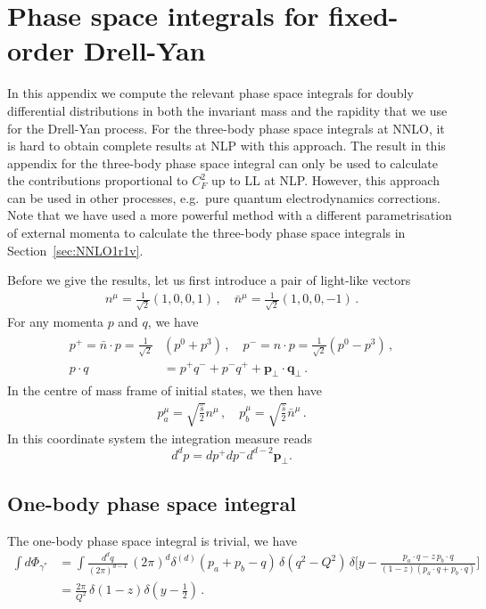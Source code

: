 \documentclass[11pt]{article}
\newcommand{\nn}{\nonumber}
\begin{document}
\section{Phase space integrals for fixed-order Drell-Yan}
\label{PhaseSpace-DY}
In this appendix we compute the relevant phase space integrals for doubly differential distributions in both the invariant mass and the rapidity that we use for the Drell-Yan process. 
For the three-body phase space integrals at NNLO, it is hard to obtain complete results at NLP with this approach. The result in this appendix for the three-body phase space integral can only be used to calculate the contributions proportional to $C_F^2$ up to LL at NLP. However, this approach can be used in other processes, e.g.\ pure quantum electrodynamics corrections. Note that we have used a more powerful method with a different parametrisation of external momenta to calculate the three-body phase space integrals in Section~\ref{sec:NNLO1r1v}. 
 
Before we give the results, let us first introduce 
a pair of light-like vectors
\begin{align} 
n^{\mu} = \frac{1}{\sqrt{2}}(1,0,0,1)\,, 
\quad \bar{n}^{\mu} = \frac{1}{\sqrt{2}}(1,0,0,-1) \,.
\end{align}
For any momenta $p$ and $q$, we have 
\begin{align}
\begin{split}\label{pppmdef}
p^+ = \bar{n}\cdot p=\frac{1}{\sqrt{2}}&(p^0+p^3)\,, 
\quad p^- = n\cdot p=\frac{1}{\sqrt{2}}(p^0-p^3) \,, \\
p\cdot q &= p^+q^-+p^-q^++\bm{p}_{\perp}\cdot \bm{q}_{\perp} \,.
\end{split}
\end{align}
In the centre of mass frame of 
initial states, we then have 
\begin{align}\label{p1p2cm}
p_a^{\mu} = \sqrt{\frac{\hat{s}}{2}}n^{\mu}\,, 
\quad p_b^{\mu} =  \sqrt{\frac{\hat{s}}{2}}\bar{n}^{\mu} \,.
\end{align}
In this coordinate system the integration 
measure reads  
\begin{equation}
  d^dp = dp^+dp^-d^{d-2}\bm{p}_\perp.
\end{equation} 
\subsection{One-body phase space integral}
\label{1PhaseSpace-DY}
%
The one-body phase space integral is trivial, we have
\begin{align}\label{eq:phaseDY1invmy}
    \int d \Phi_{\gamma^*} &= \int \frac{d^dq}{(2\pi)^{d-1}} \, (2\pi)^d\delta^{(d)}(p_a + p_b - q) \, \delta(q^2 - Q^2)\, \delta\bigg[y - \frac{p_a \cdot q - z \, p_b \cdot q}{(1-z)
(p_a \cdot q + p_b \cdot q)} \bigg] \nn \\
          &= \frac{2\pi}{Q^2} \, \delta\left(1-z\right) \delta\left(y-\frac{1}{2}\right)\,.
\end{align}
\end{document}

